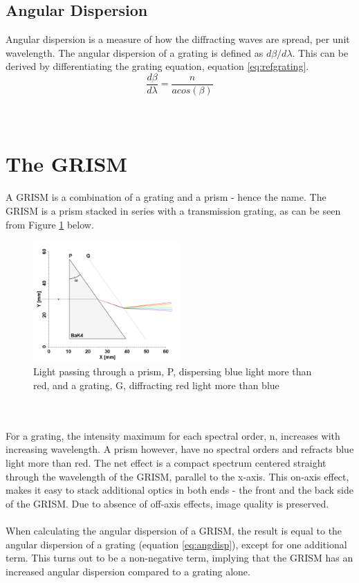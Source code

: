 \subsection{Angular Dispersion}
Angular dispersion is a measure of how the diffracting waves are spread, per unit wavelength. The angular dispersion of a grating is defined as $d\beta/d\lambda$. This can be derived by differentiating the grating equation, equation \ref{eq:refgrating}. 
\begin{equation}
    \frac{d\beta}{d\lambda} = \frac{n}{a cos(\beta)}
    \label{eq:angdisp}
\end{equation}
\\\\
\vspace{1.3cm}

\section{The GRISM}
A GRISM is a combination of a grating and a prism - hence the name. The GRISM is a prism stacked in series with a transmission grating, as can be seen from Figure \ref{fig:grism} below.
\begin{figure}[H]
    \centering
    \includegraphics[width=0.5\textwidth]{Images/theory/GRISM.png}
    \caption{Light passing through a prism, P, dispersing blue light more than red, and a grating, G, diffracting red light more than blue}
    \label{fig:grism}
\end{figure}
\\\\
For a grating, the intensity maximum for each spectral order, n, increases with increasing wavelength. A prism however, have no spectral orders and refracts blue light more than red. The net effect is a compact spectrum centered
straight through the wavelength of the GRISM, parallel to the x-axis. This on-axis effect, makes it easy to stack additional optics in both ends - the front and the back side of the GRISM. Due to absence of off-axis effects, image quality is preserved.
\\\\
When calculating the angular dispersion of a GRISM, the result is equal to the angular dispersion of a grating (equation \ref{eq:angdisp}), except for one additional term. This turns out to be a non-negative term, implying that the GRISM has an increased angular dispersion compared to a grating alone.

